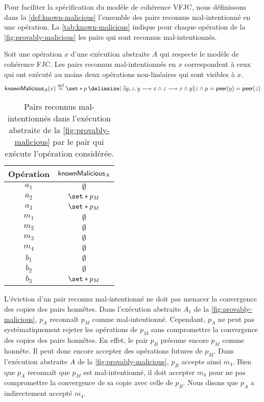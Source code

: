 Pour faciliter la spécification du modèle de cohérence \ac{VFJC}, nous définissons dans la \autoref{def:known-malicious} l'ensemble des pairs reconnus mal-intentionné en une opération.
La \autoref{tab:known-malicious} indique pour chaque opération de la \autoref{fig:provably-malicious} les pairs qui sont reconnus mal-intentionnés.

\begin{definition}\label{def:known-malicious}
  Soit une opération $x$ d'une exécution abstraite $A$ qui respecte le modèle de cohérence \acl{FJC}.
  Les pairs reconnus mal-intentionnés en $x$ correspondent à ceux qui ont exécuté au moins deux opérations non-linéaires qui sont visibles à $x$.
  \begin{equation*}
      \trm{knownMalicious}_A(x) \defeq \set*{p \given \exists y, z \qsep y \pre x \land z \pre x \land y \concur z \land p = \trm{peer}(y) = \trm{peer}(z)}
  \end{equation*}
\end{definition}

\begin{table}[htb]
    \centering
    \begin{tabular}{cc}
        Opération & $\operatorname{\mathsf{knownMalicious}}_A$ \\
        \toprule
        $a_1$ & $\emptyset$ \\
        $a_2$ & $\set*{p_M}$ \\
        $a_3$ & $\set*{p_M}$ \\
        $m_1$ & $\emptyset$ \\
        $m_2$ & $\emptyset$ \\
        $m_3$ & $\emptyset$ \\
        $m_4$ & $\emptyset$ \\
        $b_1$ & $\emptyset$ \\
        $b_2$ & $\emptyset$ \\
        $b_3$ & $\set*{p_M}$ \\
    \end{tabular}
    \caption{Pairs reconnus mal-intentionnés dans l'exécution abstraite de la \autoref{fig:provably-malicious} par le pair qui exécute l'opération considérée.}\label{tab:known-malicious}
\end{table}

L'éviction d'un pair reconnu mal-intentionné ne doit pas menacer la convergence des copies des pairs honnêtes.
Dans l'exécution abstraite $A_1$ de la \autoref{fig:provably-malicious}, $p_A$ reconnaît $p_M$ comme mal-intentionné.
Cependant, $p_A$ ne peut pas systématiquement rejeter les opérations de $p_M$ sans compromettre la convergence des copies des pairs honnêtes.
En effet, le pair $p_B$ présume encore $p_M$ comme honnête.
Il peut donc encore accepter des opérations futures de $p_M$.
Dans l'exécution abstraite $A$ de la \autoref{fig:provably-malicious}, $p_B$ accepte ainsi $m_4$.
Bien que $p_A$ reconnaît que $p_M$ est mal-intentionné, il doit accepter $m_4$ pour ne pas compromettre la convergence de sa copie avec celle de $p_B$.
Nous disons que $p_A$ a indirectement accepté $m_4$.


